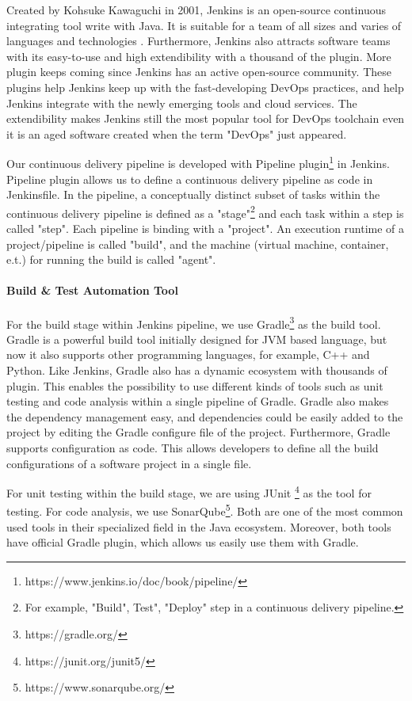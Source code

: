 \par
Created by Kohsuke Kawaguchi in 2001, Jenkins is an open-source continuous integrating tool write with Java. It is suitable for a team of all sizes and varies of languages and technologies \cite{smart2011jenkins}. Furthermore, Jenkins also attracts software teams with its easy-to-use and high extendibility \cite{smart2011jenkins} with a thousand of the plugin. More plugin keeps coming since Jenkins has an active open-source community. These plugins help Jenkins keep up with the fast-developing DevOps practices, and help Jenkins integrate with the newly emerging tools and cloud services. The extendibility makes Jenkins still the most popular tool for DevOps toolchain even it is an aged software created when the term "DevOps" just appeared.
\par
Our continuous delivery pipeline is developed with Pipeline plugin\footnote{https://www.jenkins.io/doc/book/pipeline/} in Jenkins.
Pipeline plugin allows us to define a continuous delivery pipeline as code in Jenkinsfile.
In the pipeline, a conceptually distinct subset of tasks within the continuous delivery pipeline \cite{Pipeline85:online} is defined as a "stage"\footnote{For example, "Build", Test", "Deploy" step in a continuous delivery pipeline.} and each task within a step is called "step". Each pipeline is binding with a "project". An execution runtime of a project/pipeline is called "build", and the machine (virtual machine, container, e.t.) for running the build is called "agent".
\paragraph[]{Build \& Test Automation Tool}
For the build stage within Jenkins pipeline, we use Gradle\footnote{https://gradle.org/} as the build tool.
Gradle is a powerful build tool initially designed for JVM based language, but now it also supports other programming languages, for example, C++ and Python. Like Jenkins, Gradle also has a dynamic ecosystem with thousands of plugin. This enables the possibility to use different kinds of tools such as unit testing and code analysis within a single pipeline of Gradle. Gradle also makes the dependency management easy, and dependencies could be easily added to the project by editing the Gradle configure file of the project. Furthermore, Gradle supports configuration as code. This allows developers to define all the build configurations of a software project in a single file.
\par
For unit testing within the build stage, we are using JUnit \footnote{https://junit.org/junit5/} as the tool for testing. For code analysis, we use SonarQube\footnote{https://www.sonarqube.org/}. Both are one of the most common used tools in their specialized field in the Java ecosystem. Moreover, both tools have official Gradle plugin, which allows us easily use them with Gradle.
